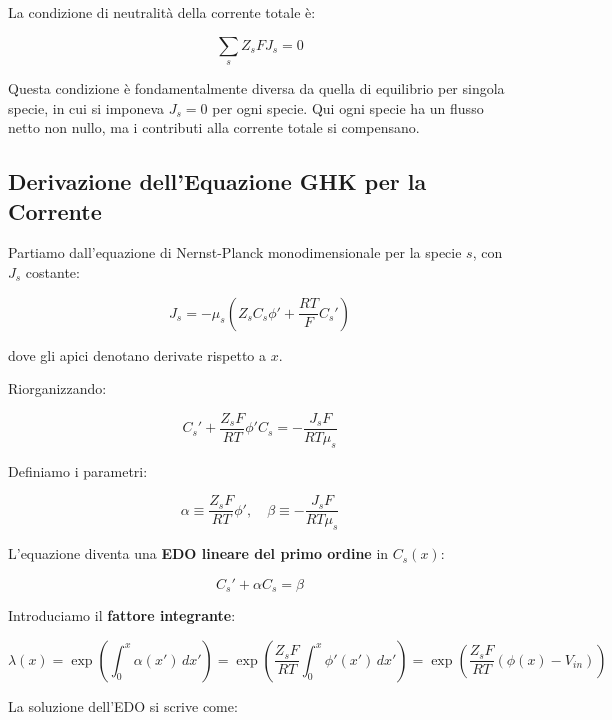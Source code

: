 La condizione di neutralità della corrente totale è:

\begin{equation}
\sum_s Z_s F J_s = 0
\end{equation}

Questa condizione è fondamentalmente diversa da quella di equilibrio per singola specie, in cui si imponeva $J_s = 0$ per ogni specie. Qui ogni specie ha un flusso netto non nullo, ma i contributi alla corrente totale si compensano.


\subsection{Derivazione dell'Equazione GHK per la Corrente}


Partiamo dall'equazione di Nernst-Planck monodimensionale per la specie $s$, con $J_s$ costante:

\begin{equation}
J_s = -\mu_s \left( Z_s C_s \phi' + \frac{RT}{F} C_s' \right)
\end{equation}

dove gli apici denotano derivate rispetto a $x$.

Riorganizzando:

\begin{equation}
C_s' + \frac{Z_s F}{RT} \phi' C_s = -\frac{J_s F}{RT \mu_s}
\end{equation}

Definiamo i parametri:

\begin{equation}
\alpha \equiv \frac{Z_s F}{RT} \phi', \quad \beta \equiv -\frac{J_s F}{RT \mu_s}
\end{equation}

L'equazione diventa una \textbf{EDO lineare del primo ordine} in $C_s(x)$:

\begin{equation}
C_s' + \alpha C_s = \beta
\end{equation}



Introduciamo il \textbf{fattore integrante}:

\begin{equation}
\lambda(x) = \exp\left(\int_0^x \alpha(x')\,dx'\right) = \exp\left(\frac{Z_s F}{RT}\int_0^x \phi'(x')\,dx'\right) = \exp\left(\frac{Z_s F}{RT}(\phi(x) - V_{in})\right)
\end{equation}

La soluzione dell'EDO si scrive come:

